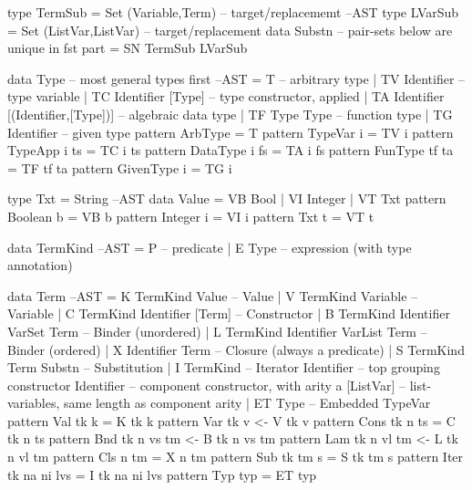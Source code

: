 \begin{code}
type TermSub = Set (Variable,Term) -- target/replacememt                --AST
type LVarSub = Set (ListVar,ListVar) -- target/replacement
data Substn --  pair-sets below are unique in fst part
  = SN TermSub LVarSub
\end{code}

\newpage
\begin{code}
data Type -- most general types first                                   --AST
 = T  -- arbitrary type
 | TV Identifier -- type variable
 | TC Identifier [Type] -- type constructor, applied
 | TA Identifier [(Identifier,[Type])] -- algebraic data type
 | TF Type Type -- function type
 | TG Identifier -- given type
pattern ArbType = T
pattern TypeVar i  = TV i
pattern TypeApp i ts = TC i ts
pattern DataType i fs = TA i fs
pattern FunType tf ta = TF tf ta
pattern GivenType i = TG i
\end{code}


\begin{code}
type Txt = String                                                        --AST
data Value
 = VB Bool
 | VI Integer
 | VT Txt
pattern Boolean b  =  VB b
pattern Integer i  =  VI i
pattern Txt     t  =  VT t
\end{code}

\begin{code}
data TermKind                                                            --AST
 = P -- predicate
 | E Type -- expression (with type annotation)
\end{code}

\begin{code}
data Term                                                                --AST
 = K TermKind Value                    -- Value
 | V TermKind Variable                 -- Variable
 | C TermKind Identifier [Term]        -- Constructor
 | B TermKind Identifier VarSet Term   -- Binder (unordered)
 | L TermKind Identifier VarList Term  -- Binder (ordered)
 | X Identifier Term                   -- Closure (always a predicate)
 | S TermKind Term Substn              -- Substitution
 | I TermKind                          -- Iterator
     Identifier  -- top grouping constructor
     Identifier  -- component constructor, with arity a
     [ListVar]   -- list-variables, same length as component arity
 | ET Type                              -- Embedded TypeVar
pattern Val  tk k          =   K tk k
pattern Var  tk v          <-  V tk v
pattern Cons tk n ts       =   C tk n ts
pattern Bnd  tk n vs tm    <-  B tk n vs tm
pattern Lam  tk n vl tm    <-  L tk n vl tm
pattern Cls     n    tm    =   X n tm
pattern Sub  tk tm s       =   S tk tm s
pattern Iter tk na ni lvs  =   I tk na ni lvs
pattern Typ  typ           =   ET typ
\end{code}


